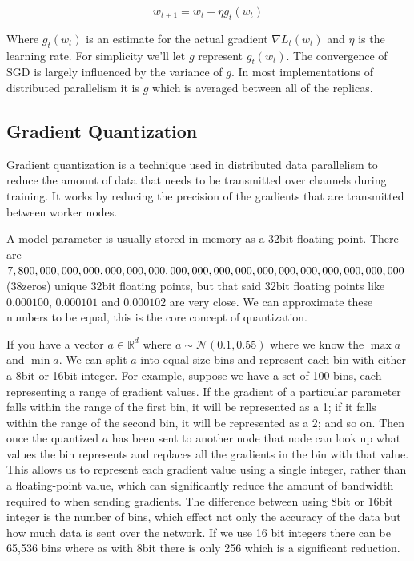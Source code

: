 \documentclass[11pt]{article}
\begin{document}
$$
w_{t+1} = w_t - \eta g_t(w_t)
$$

Where $g_t(w_t)$ is an estimate for the actual gradient ${\nabla} L_t(w_t)$ and $\eta$ is the learning rate. For simplicity we'll let $g$ represent $g_t(w_t)$. The convergence of SGD is largely influenced by the variance of $g$. In most implementations of distributed parallelism it is $g$ which is averaged between all of the replicas.


\subsection{Gradient Quantization}
Gradient quantization is a technique used in distributed data parallelism to reduce the amount of data that needs to be transmitted over channels during training. It works by reducing the precision of the gradients that are transmitted between worker nodes.

A model parameter is usually stored in memory as a 32bit floating point. There are $7, 800, 000, 000,\\ 000, 000,000,000,000,000,000,000,000,000,000,000,000,000,000$(38zeros) unique 32bit floating points, but that said 32bit floating points like $0.000100$, $0.000101$ and $0.000102$ are very close. We can approximate these numbers to be equal, this is the core concept of quantization.

If you have a vector $a \in \mathbb{R}^d$ where $a \sim \mathcal{N}(0.1,0.55)$ where we know the $\max a$ and $\min a$. We can split $a$ into equal size bins and represent each bin with either a 8bit or 16bit integer. For example, suppose we have a set of 100 bins, each representing a range of gradient values. If the gradient of a particular parameter falls within the range of the first bin, it will be represented as a 1; if it falls within the range of the second bin, it will be represented as a 2; and so on. Then once the quantized $a$ has been sent to another node that node can look up what values the bin represents and replaces all the gradients in the bin with that value. This allows us to represent each gradient value using a single integer, rather than a floating-point value, which can significantly reduce the amount of bandwidth required to when sending gradients. The difference between using 8bit or 16bit integer is the number of bins, which effect not only the accuracy of the data but how much data is sent over the network. If we use 16 bit integers there can be 65,536 bins where as with 8bit there is only 256 which is a significant reduction.
\end{document}
